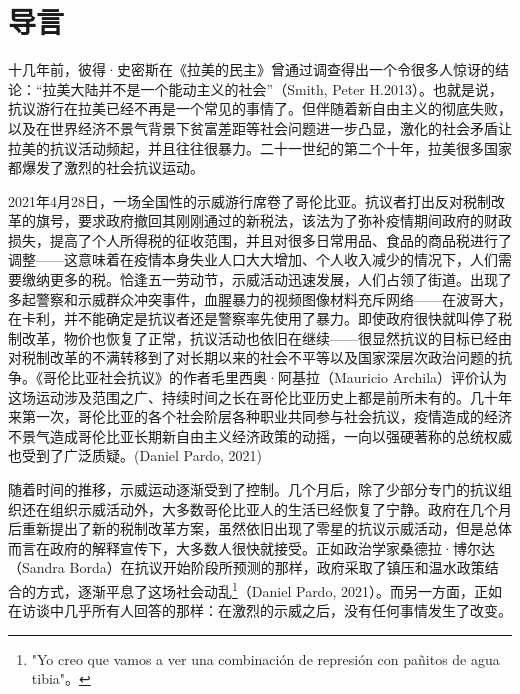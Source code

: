 \documentclass{phyasgn}\usepackage{nag}
\begin{document}
\section{导言}
十几年前，彼得·史密斯在《拉美的民主》曾通过调查得出一个令很多人惊讶的结论：“拉美大陆并不是一个能动主义的社会”（Smith, Peter H.2013）。也就是说，抗议游行在拉美已经不再是一个常见的事情了。但伴随着新自由主义的彻底失败，以及在世界经济不景气背景下贫富差距等社会问题进一步凸显，激化的社会矛盾让拉美的抗议活动频起，并且往往很暴力。二十一世纪的第二个十年，拉美很多国家都爆发了激烈的社会抗议运动。
\par 2021年4月28日，一场全国性的示威游行席卷了哥伦比亚。抗议者打出反对税制改革的旗号，要求政府撤回其刚刚通过的新税法，该法为了弥补疫情期间政府的财政损失，提高了个人所得税的征收范围，并且对很多日常用品、食品的商品税进行了调整——这意味着在疫情本身失业人口大大增加、个人收入减少的情况下，人们需要缴纳更多的税。恰逢五一劳动节，示威活动迅速发展，人们占领了街道。出现了多起警察和示威群众冲突事件，血腥暴力的视频图像材料充斥网络——在波哥大，在卡利，并不能确定是抗议者还是警察率先使用了暴力。即使政府很快就叫停了税制改革，物价也恢复了正常，抗议活动也依旧在继续——很显然抗议的目标已经由对税制改革的不满转移到了对长期以来的社会不平等以及国家深层次政治问题的抗争。《哥伦比亚社会抗议》的作者毛里西奥·阿基拉（Mauricio Archila）评价认为这场运动涉及范围之广、持续时间之长在哥伦比亚历史上都是前所未有的。几十年来第一次，哥伦比亚的各个社会阶层各种职业共同参与社会抗议，疫情造成的经济不景气造成哥伦比亚长期新自由主义经济政策的动摇，一向以强硬著称的总统权威也受到了广泛质疑。(Daniel Pardo, 2021)
\par 随着时间的推移，示威运动逐渐受到了控制。几个月后，除了少部分专门的抗议组织还在组织示威活动外，大多数哥伦比亚人的生活已经恢复了宁静。政府在几个月后重新提出了新的税制改革方案，虽然依旧出现了零星的抗议示威活动，但是总体而言在政府的解释宣传下，大多数人很快就接受。正如政治学家桑德拉·博尔达（Sandra Borda）在抗议开始阶段所预测的那样，政府采取了镇压和温水政策结合的方式，逐渐平息了这场社会动乱\footnote[1]{"Yo creo que vamos a ver una combinación de represión con pañitos de agua tibia"。}（Daniel Pardo, 2021）。而另一方面，正如在访谈中几乎所有人回答的那样：在激烈的示威之后，没有任何事情发生了改变。
\end{document}
